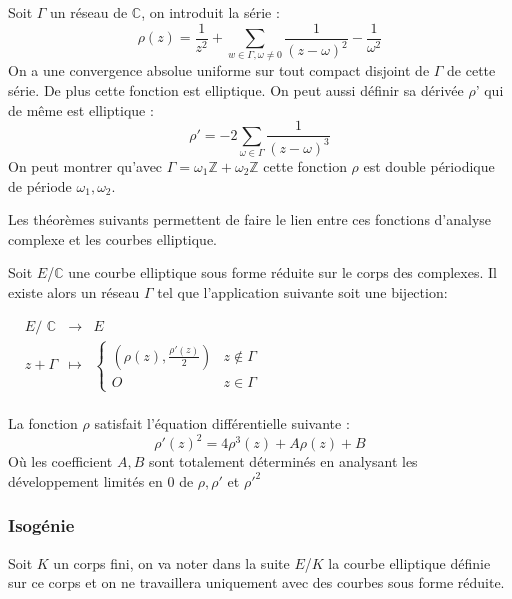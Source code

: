 \documentclass{article}
\begin{document}
\begin{defi}
Soit $\Gamma$ un réseau de $\mathbb{C}$, on introduit la série :
\begin{equation*}
\rho(z) = \frac{1}{z^2} + \sum_{w \in \Gamma, \omega \ne 0} \frac{1}{(z-\omega)^2} - \frac{1}{\omega^2}
\end{equation*}
On a une convergence absolue uniforme sur tout compact disjoint de $\Gamma$ de cette série. De plus cette fonction est elliptique. On peut aussi définir sa dérivée $\rho$' qui de même est elliptique :
\begin{equation*}
\rho' = -2 \sum_{\omega \in \Gamma} \frac{1}{(z-\omega)^3}
\end{equation*}
On peut montrer qu'avec $\Gamma = \omega_1 \mathbb{Z} + \omega_2 \mathbb{Z}$ cette fonction $\rho$ est double périodique de période $\omega_1, \omega_2$.
\end{defi}

Les théorèmes suivants permettent de faire le lien entre ces fonctions d'analyse complexe et les courbes elliptique.

\begin{thm}
Soit $E$/$\mathbb{C}$ une courbe elliptique sous forme réduite sur le corps des complexes. Il existe alors un réseau $\Gamma$ tel que l'application suivante soit une bijection:
\newline
\medskip


$\begin{array}{cccc}
& E\text{/ }\mathbb{C} & \to & E \\
& z + \Gamma & \mapsto & \left\lbrace
\begin{array}{cc}
 (\rho(z), \frac{\rho'(z)}{2})  & z \notin \Gamma \\
 O & z \in \Gamma
\end{array}\right.\\
\end{array}$
\end{thm}

\begin{thm}
La fonction $\rho$ satisfait l'équation différentielle suivante : 
\begin{equation*}
\rho'(z)^2 = 4\rho^3(z) + A \rho(z) + B
\end{equation*}
Où les coefficient $A,B$ sont totalement déterminés en analysant les développement limités en $0$ de $\rho, \rho'$ et $\rho'^2$ 
\end{thm}

\subsubsection{Isogénie}
Soit $K$ un corps fini, on va noter dans la suite $E$/$K$ la courbe elliptique définie sur ce corps et on ne travaillera uniquement avec des courbes sous forme réduite.
\end{document}
